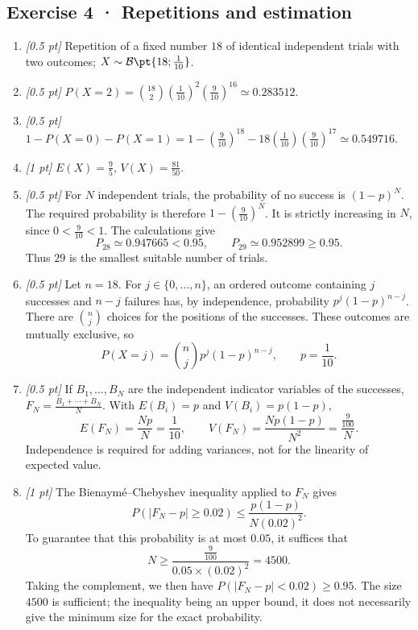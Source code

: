 \subsection*{Exercise 4 · Repetitions and estimation}\begin{enumerate}

\item \textit{[0.5 pt]} Repetition of a fixed number $18$ of identical independent trials with two outcomes; $X\sim\mathcal B\pt{18;\frac{1}{10}}$.

\item \textit{[0.5 pt]} $P(X=2)=\binom{18}2(\frac{1}{10})^2(\frac{9}{10})^{16}\simeq\num{0,283512}$.

\item \textit{[0.5 pt]} $1-P(X=0)-P(X=1)=1-(\frac{9}{10})^{18}-18(\frac{1}{10})(\frac{9}{10})^{17}\simeq\num{0,549716}$.

\item \textit{[1 pt]} $E(X)=\frac{9}{5}$, $V(X)=\frac{81}{50}$.

\item \textit{[0.5 pt]} For $N$ independent trials, the probability of no success is $(1-p)^N$. The required probability is therefore $1-(\frac{9}{10})^N$. It is strictly increasing in $N$, since $0<\frac{9}{10}<1$. The calculations give
\[P_{28}\simeq\num{0,947665}<\num{0,95},\qquad P_{29}\simeq\num{0,952899}\ge\num{0,95}.\]
Thus $29$ is the smallest suitable number of trials.

\item \textit{[0.5 pt]} Let $n=18$. For $j\in\{0,\ldots,n\}$, an ordered outcome containing $j$ successes and $n-j$ failures has, by independence, probability $p^j(1-p)^{n-j}$. There are $\binom nj$ choices for the positions of the successes. These outcomes are mutually exclusive, so
\[P(X=j)=\binom nj p^j(1-p)^{n-j},\qquad p=\frac{1}{10}.\]

\item \textit{[0.5 pt]} If $B_1,\ldots,B_N$ are the independent indicator variables of the successes, $F_N=\frac{B_1+\cdots+B_N}{N}$. With $E(B_i)=p$ and $V(B_i)=p(1-p)$,
\[E(F_N)=\frac{Np}{N}=\frac{1}{10},\qquad V(F_N)=\frac{Np(1-p)}{N^2}=\frac{\frac{9}{100}}{N}.\]
Independence is required for adding variances, not for the linearity of expected value.

\item \textit{[1 pt]} The Bienaymé–Chebyshev inequality applied to $F_N$ gives
\[P(|F_N-p|\ge\num{0,02})\le\frac{p(1-p)}{N(\num{0,02})^2}.\]
To guarantee that this probability is at most $\num{0,05}$, it suffices that
\[N\ge\frac{\frac{9}{100}}{\num{0,05}\times(\num{0,02})^2}=4500.\]
Taking the complement, we then have $P(|F_N-p|<\num{0,02})\ge\num{0,95}$. The size $4500$ is sufficient; the inequality being an upper bound, it does not necessarily give the minimum size for the exact probability.

\end{enumerate}


